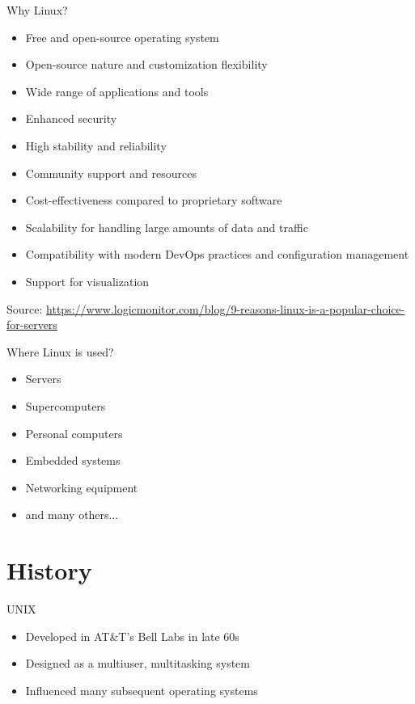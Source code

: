\documentclass{beamer}
\begin{document}
\begin{frame}{Why Linux?}
  \begin{itemize}
    \item Free and open-source operating system
    \item Open-source nature and customization flexibility
    \item Wide range of applications and tools
    \item Enhanced security
    \item High stability and reliability
    \item Community support and resources
    \item Cost-effectiveness compared to proprietary software
    \item Scalability for handling large amounts of data and traffic
    \item Compatibility with modern DevOps practices and configuration management
    \item Support for visualization
  \end{itemize}

  \footnotesize Source: \href{https://www.logicmonitor.com/blog/9-reasons-linux-is-a-popular-choice-for-servers}{https://www.logicmonitor.com/blog/9-reasons-linux-is-a-popular-choice-for-servers}
\end{frame}

\begin{frame}{Where Linux is used?}
  \begin{itemize}
    \item Servers
    \item Supercomputers
    \item Personal computers
    \item Embedded systems
    \item Networking equipment
    \item and many others...
  \end{itemize}
\end{frame}

\section{History}

\begin{frame}{UNIX}
  \begin{itemize}
    \item Developed in AT\&T's Bell Labs in late 60s
    \item Designed as a multiuser, multitasking system
    \item Influenced many subsequent operating systems
  \end{itemize}
\end{frame}
\end{document}
